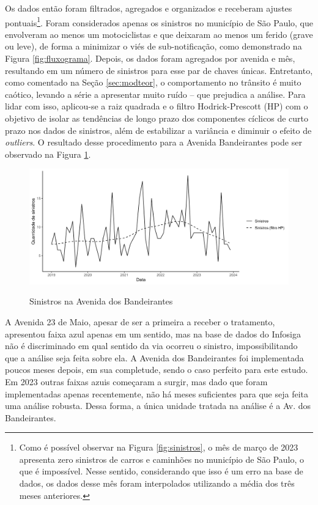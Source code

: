 Os dados então foram filtrados, agregados e organizados e receberam ajustes pontuais\footnote{Como é possível observar na Figura \ref{fig:sinistros}, o mês de março de 2023 apresenta zero sinistros de carros e caminhões no município de São Paulo, o que é impossível. Nesse sentido, considerando que isso é um erro na base de dados, os dados desse mês foram interpolados utilizando a média dos três meses anteriores.}. Foram considerados apenas os sinistros no município de São Paulo, que envolveram ao menos um motociclistas e que deixaram ao menos um ferido (grave ou leve), de forma a minimizar o viés de sub-notificação, como demonstrado na Figura \ref{fig:fluxograma}. Depois, os dados foram agregados por avenida e mês, resultando em um número de sinistros para esse par de chaves únicas. Entretanto, como comentado na Seção \ref{sec:modteor}, o comportamento no trânsito é muito caótico, levando a série a apresentar muito ruído -- que prejudica a análise. Para lidar com isso, aplicou-se a raiz quadrada e o filtro Hodrick-Prescott (HP) com o objetivo de isolar as tendências de longo prazo dos componentes cíclicos de curto prazo nos dados de sinistros, além de estabilizar a variância e diminuir o efeito de \textit{outliers}. O resultado desse procedimento para a Avenida Bandeirantes pode ser observado na Figura \ref{fig:bandeirantes}.

\begin{figure}[h]
    \centering
    \caption{Sinistros na Avenida dos Bandeirantes}
    \includegraphics[width = 0.8\linewidth]{relatorios/faixa-azul/figuras/FiltroHP.png}
    \label{fig:bandeirantes}
\end{figure}

A Avenida 23 de Maio, apesar de ser a primeira a receber o tratamento, apresentou faixa azul apenas em um sentido, mas na base de dados do Infosiga não é discriminado em qual sentido da via ocorreu o sinistro, impossibilitando que a análise seja feita sobre ela. A Avenida dos Bandeirantes foi implementada poucos meses depois, em sua completude, sendo o caso perfeito para este estudo. Em 2023 outras faixas azuis começaram a surgir, mas dado que foram implementadas apenas recentemente, não há meses suficientes para que seja feita uma análise robusta. Dessa forma, a única unidade tratada na análise é a Av. dos Bandeirantes.

